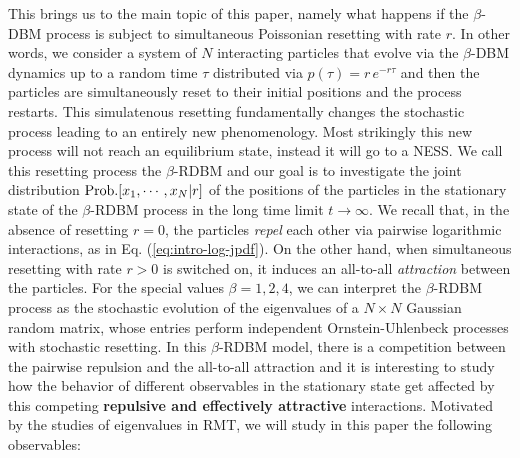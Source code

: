 \documentclass[onecolumn,superscriptaddress,
 amsmath,amssymb,
 aps,
 prd,
]{revtex4-1}
\begin{document}


This brings us to the main topic of this paper, namely what happens if the $\beta$-DBM process is subject to simultaneous Poissonian resetting with rate $r$. In other words, we consider a system of $N$ interacting particles that evolve via the $\beta$-DBM dynamics up to a random time $\tau$ distributed via $p(\tau) = r\,e^{-r \tau}$ and then the particles are simultaneously reset to their initial positions and the process restarts. 
{\color{blue} 
This simulatenous resetting fundamentally changes the stochastic process leading to an entirely new phenomenology. Most strikingly this new process will not reach an equilibrium state, instead it will go to a NESS.
}
We call this resetting process the $\beta$-RDBM and  
our goal is to investigate the joint distribution ${\rm Prob.}[x_1, \cdots, x_N | r]$ of the positions of the particles in the stationary state of the $\beta$-RDBM process in the long time limit $t \to \infty$. We recall that, in the absence of resetting $r=0$, the particles {\it repel} each other via pairwise logarithmic interactions, as in Eq. (\ref{eq:intro-log-jpdf}). On the other hand, when simultaneous resetting with rate $r>0$ is switched on, it induces an all-to-all {\it attraction} between the particles. For the special values $\beta = 1,2,4$, we can interpret the $\beta$-RDBM process as the stochastic evolution of the eigenvalues of a $N \times N$ Gaussian random matrix, whose entries perform independent Ornstein-Uhlenbeck processes with stochastic resetting. In this $\beta$-RDBM model, there is a competition between the pairwise repulsion and the all-to-all attraction and it is interesting to study how the behavior of different observables in the stationary state get affected by this competing {\bf repulsive and effectively attractive} interactions. Motivated by the studies of eigenvalues in RMT, we will study in this paper the following observables: 
\end{document}
